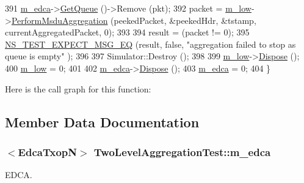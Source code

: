 \begin{DoxyCode}
391   \hyperlink{classTwoLevelAggregationTest_a6ec1a641b23f7f6d1652462575d4feb1}{m\_edca}->\hyperlink{classns3_1_1DcaTxop_a6c89d0aeccbc5e8724d404bc45f796d7}{GetQueue} ()->Remove (pkt);
392   packet = \hyperlink{classTwoLevelAggregationTest_a408234bde940ec7a7a61112d512f7a63}{m\_low}->\hyperlink{classns3_1_1MacLow_aabd112b43fd3be901c743b21d41f787f}{PerformMsduAggregation} (peekedPacket, &peekedHdr, &tstamp, 
      currentAggregatedPacket, 0);
393 
394   result = (packet != 0);
395   \hyperlink{group__testing_ga7304ba46a28d8cf08dfdfd6499cf7068}{NS\_TEST\_EXPECT\_MSG\_EQ} (result, \textcolor{keyword}{false}, \textcolor{stringliteral}{"aggregation failed to stop as queue is empty"}
      );
396 
397   Simulator::Destroy ();
398 
399   \hyperlink{classTwoLevelAggregationTest_a408234bde940ec7a7a61112d512f7a63}{m\_low}->\hyperlink{classns3_1_1Object_aa90ae598863f6c251cdab3c3722afdaf}{Dispose} ();
400   \hyperlink{classTwoLevelAggregationTest_a408234bde940ec7a7a61112d512f7a63}{m\_low} = 0;
401 
402   \hyperlink{classTwoLevelAggregationTest_a6ec1a641b23f7f6d1652462575d4feb1}{m\_edca}->\hyperlink{classns3_1_1Object_aa90ae598863f6c251cdab3c3722afdaf}{Dispose} ();
403   \hyperlink{classTwoLevelAggregationTest_a6ec1a641b23f7f6d1652462575d4feb1}{m\_edca} = 0;
404 \}
\end{DoxyCode}


Here is the call graph for this function\+:




\subsection{Member Data Documentation}
\subsubsection[{\texorpdfstring{m\+\_\+edca}{m_edca}}]{$<${\bf Edca\+TxopN}$>$ Two\+Level\+Aggregation\+Test\+::m\+\_\+edca\hspace{0.3cm}{\ttfamily [private]}}\hypertarget{classTwoLevelAggregationTest_a6ec1a641b23f7f6d1652462575d4feb1}{}\label{classTwoLevelAggregationTest_a6ec1a641b23f7f6d1652462575d4feb1}


E\+D\+CA. 

